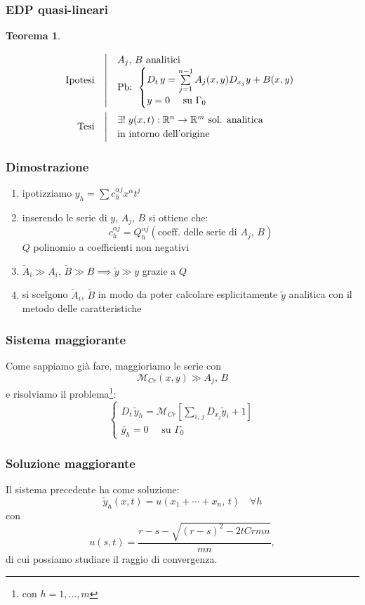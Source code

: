 \documentclass[serif,notheorems]{beamer}
\makeatletter
\newenvironment{ipotesi}%
{\quad\left|\quad\def\arraystretch{1.2}\begin{array}{@{}l@{}}}%
{\end{array}\right.}
\newcommand{\hpth}[2]
{
\begin{align*}
\quad
\text{Ipotesi}
&\begin{ipotesi}
#1
\end{ipotesi}\\
\text{Tesi}
&\begin{ipotesi}
#2
\end{ipotesi}
\end{align*}
}
\theoremstyle{definition} %
\newtheorem{theorem}{Teorema}[section] %
\theoremstyle{remark}
\makeatother
\begin{document}
\begin{frame}
\frametitle{EDP quasi-lineari}
\begin{theorem}\label{teoquasilin}
\hpth{
A_j , \, B\text{ analitici }\\
\text{Pb: }
\begin{cases}
D_t \, y = \sum\limits_{j=1}^{n-1} A_j(x,y)D_{x_j}y+B(x,y) \; \\
y=0 \quad \text{ su } \Gamma_0
\end{cases}
\\
}{
\exists ! \; y(x,t): \mathbb{R}^n \rightarrow \mathbb{R}^m
\text{ sol. analitica} \\ \text{in intorno dell'origine}
}
\end{theorem}
\end{frame}

\begin{frame}
\frametitle{Dimostrazione}
\begin{enumerate}
\item ipotizziamo $y_h = \sum c_h^{\alpha j} x^\alpha t^j$
\item inserendo le serie di $y,\, A_j,\, B$ si ottiene che: 
$$ c_h^{\alpha j} = Q_h^{\alpha j}(\text{coeff. delle serie di }A_j, \, B)$$
$Q$ polinomio a coefficienti non negativi
\item $\widetilde{A}_i \gg A_i, \, \widetilde{B} \gg B \implies \widetilde{y} \gg y$ grazie a $Q$
\item si scelgono $\widetilde{A}_i, \, \widetilde{B}$ in modo da poter calcolare esplicitamente $\widetilde{y}$ analitica con il metodo delle caratteristiche
\end{enumerate}
\end{frame}

\begin{frame}
\frametitle{Sistema maggiorante}
Come sappiamo già fare, maggioriamo le serie con 
$$\mathcal{M}_{Cr}(x,y) \gg A_j,\, B$$
e risolviamo il problema\footnote{con $h=1,\ldots, m$}:
\begin{equation*}
\begin{cases}
D_t \, \widetilde{y}_h = \mathcal{M}_{Cr} \left[\sum\limits_{i,\, j} D_{x_j}\widetilde{y}_i+1 \right] \\
\widetilde{y_h}=0 \quad \text{ su } \Gamma_0
\end{cases}
\end{equation*}
\end{frame}

\begin{frame}
\frametitle{Soluzione maggiorante}
Il sistema precedente ha come soluzione:
$$\widetilde{y}_h(x,t)=u(x_1+\cdots +x_n,\,t) \quad \forall h$$
con
$$u(s,t)=\frac{r-s-\sqrt{(r-s)^2-2tCrmn}}{mn},$$
di cui possiamo studiare il raggio di convergenza.
\end{frame}
\end{document}
